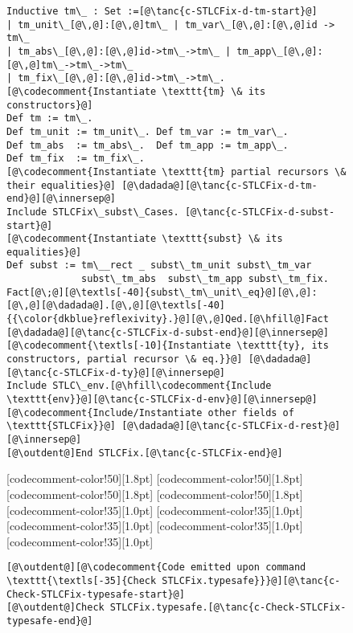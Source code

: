 \begin{figure}
\begin{minipage}{\textwidth}
\begin{multicols}{2}
\begin{lstlisting}
Inductive tm\_ : Set :=[@\tanc{c-STLCFix-d-tm-start}@]
| tm_unit\_[@\,@]:[@\,@]tm\_ | tm_var\_[@\,@]:[@\,@]id -> tm\_
| tm_abs\_[@\,@]:[@\,@]id->tm\_->tm\_ | tm_app\_[@\,@]:[@\,@]tm\_->tm\_->tm\_
| tm_fix\_[@\,@]:[@\,@]id->tm\_->tm\_.
[@\codecomment{Instantiate \texttt{tm} \& its constructors}@]
Def tm := tm\_.
Def tm_unit := tm_unit\_. Def tm_var := tm_var\_.
Def tm_abs  := tm_abs\_.  Def tm_app := tm_app\_.
Def tm_fix  := tm_fix\_.
[@\codecomment{Instantiate \texttt{tm} partial recursors \& their equalities}@] [@\dadada@][@\tanc{c-STLCFix-d-tm-end}@][@\innersep@]
Include STLCFix\_subst\_Cases. [@\tanc{c-STLCFix-d-subst-start}@]
[@\codecomment{Instantiate \texttt{subst} \& its equalities}@]
Def subst := tm\__rect _ subst\_tm_unit subst\_tm_var
             subst\_tm_abs  subst\_tm_app subst\_tm_fix.
Fact[@\;@][@\textls[-40]{subst\_tm\_unit\_eq}@][@\,@]:[@\,@][@\dadada@].[@\,@][@\textls[-40]{{\color{dkblue}reflexivity}.}@][@\,@]Qed.[@\hfill@]Fact [@\dadada@][@\tanc{c-STLCFix-d-subst-end}@][@\innersep@]
[@\codecomment{\textls[-10]{Instantiate \texttt{ty}, its constructors, partial recursor \& eq.}}@] [@\dadada@][@\tanc{c-STLCFix-d-ty}@][@\innersep@]
Include STLC\_env.[@\hfill\codecomment{Include \texttt{env}}@][@\tanc{c-STLCFix-d-env}@][@\innersep@]
[@\codecomment{Include/Instantiate other fields of \texttt{STLCFix}}@] [@\dadada@][@\tanc{c-STLCFix-d-rest}@][@\innersep@]
[@\outdent@]End STLCFix.[@\tanc{c-STLCFix-end}@]
\end{lstlisting}

[codecomment-color!50][1.8pt]
[codecomment-color!50][1.8pt]
[codecomment-color!50][1.8pt]
[codecomment-color!50][1.8pt]
[codecomment-color!35][1.0pt]
[codecomment-color!35][1.0pt]
[codecomment-color!35][1.0pt]
[codecomment-color!35][1.0pt]
[codecomment-color!35][1.0pt]

\vspace{-8pt}


\begin{lstlisting}
[@\outdent@][@\codecomment{Code emitted upon command \texttt{\textls[-35]{Check STLCFix.typesafe}}}@][@\tanc{c-Check-STLCFix-typesafe-start}@]
[@\outdent@]Check STLCFix.typesafe.[@\tanc{c-Check-STLCFix-typesafe-end}@]
\end{lstlisting}


\end{multicols}
\end{minipage}
\end{figure}
